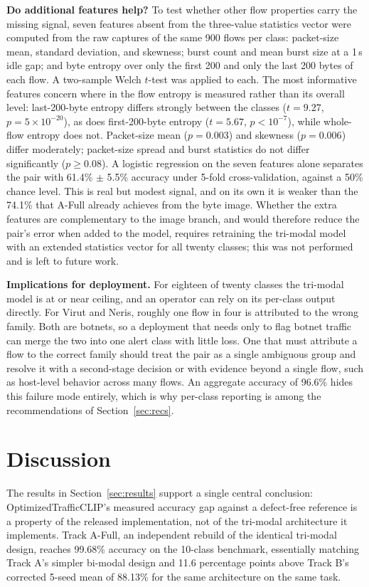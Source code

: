 \documentclass[journal]{IEEEtran}
\begin{document}
\textbf{Do additional features help?} To test whether other flow properties carry the missing signal, seven features absent from the three-value statistics vector were computed from the raw captures of the same 900 flows per class: packet-size mean, standard deviation, and skewness; burst count and mean burst size at a 1\,s idle gap; and byte entropy over only the first 200 and only the last 200 bytes of each flow. A two-sample Welch $t$-test was applied to each. The most informative features concern where in the flow entropy is measured rather than its overall level: last-200-byte entropy differs strongly between the classes ($t=9.27$, $p=5\times10^{-20}$), as does first-200-byte entropy ($t=5.67$, $p<10^{-7}$), while whole-flow entropy does not. Packet-size mean ($p=0.003$) and skewness ($p=0.006$) differ moderately; packet-size spread and burst statistics do not differ significantly ($p\geq0.08$). A logistic regression on the seven features alone separates the pair with 61.4\% $\pm$ 5.5\% accuracy under 5-fold cross-validation, against a 50\% chance level. This is real but modest signal, and on its own it is weaker than the 74.1\% that A-Full already achieves from the byte image. Whether the extra features are complementary to the image branch, and would therefore reduce the pair's error when added to the model, requires retraining the tri-modal model with an extended statistics vector for all twenty classes; this was not performed and is left to future work.

\textbf{Implications for deployment.} For eighteen of twenty classes the tri-modal model is at or near ceiling, and an operator can rely on its per-class output directly. For Virut and Neris, roughly one flow in four is attributed to the wrong family. Both are botnets, so a deployment that needs only to flag botnet traffic can merge the two into one alert class with little loss. One that must attribute a flow to the correct family should treat the pair as a single ambiguous group and resolve it with a second-stage decision or with evidence beyond a single flow, such as host-level behavior across many flows. An aggregate accuracy of 96.6\% hides this failure mode entirely, which is why per-class reporting is among the recommendations of Section~\ref{sec:recs}.

\section{Discussion}\label{sec:discussion}

The results in Section~\ref{sec:results} support a single central conclusion: OptimizedTrafficCLIP's measured accuracy gap against a defect-free reference is a property of the released implementation, not of the tri-modal architecture it implements. Track A-Full, an independent rebuild of the identical tri-modal design, reaches 99.68\% accuracy on the 10-class benchmark, essentially matching Track A's simpler bi-modal design and 11.6 percentage points above Track B's corrected 5-seed mean of 88.13\% for the same architecture on the same task.
\end{document}
